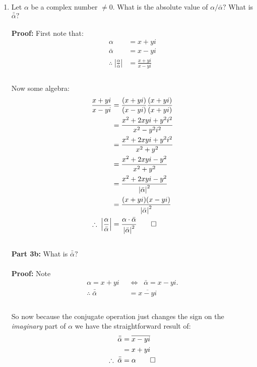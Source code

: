 \begin{enumerate}
	\item Let $\alpha$ be a complex number $\neq 0.$ What is the absolute value of $\alpha/\bar{\alpha}?$ What is $\bar{\bar{\alpha}}?$ \\
	\\
	\textbf{Proof:} First note that: 
	\begin{align*}
	\alpha &= x + yi \\
	\bar{\alpha} &= x - yi \\
	\therefore \; \left| \frac{\alpha}{\bar{\alpha}} \right| &= \frac{x + yi}{x - yi} \\
	\end{align*}
	\\
	Now some algebra:
	\begin{align*}
	\frac{x + yi}{x - yi} &= \frac{(x + yi)}{(x - yi)} \frac{(x + yi)}{(x + yi)} \\
	&= \frac{x^2 + 2xyi +y^2 i^2}{x^2 - y^2 i^2} \\
	&= \frac{x^2 + 2xyi +y^2 i^2}{x^2 + y^2} \\
	&= \frac{x^2 + 2xyi - y^2}{x^2 + y^2 } \\
	&= \frac{x^2 + 2xyi - y^2}{ \left | \bar{\alpha} \right |^2  } \\
	&= \frac{(x + yi)(x - yi)}{ \left | \bar{\alpha} \right |^2  } \\
	\therefore \; \left| \frac{\alpha}{\bar{\alpha}} \right|  &= \frac{\alpha \cdot \bar{\alpha}}{ \left | \bar{\alpha} \right |^2  } \qed \\
	\end{align*}
	\\
	\subitem \textbf{Part 3b:} What is $\bar{\bar{\alpha}}?$ \\
	\\
	\textbf{Proof:} Note 
	\begin{align*}
	\alpha = x + yi \;\; & \Leftrightarrow \;\; \bar{\alpha} = x - yi. \\ 
	\therefore \; \bar{\bar{\alpha}} &= \overline{x - yi}\\
	\end{align*}
	\\
	So now because the conjugate operation just changes the sign on the \textit{imaginary} part of $\alpha$ we have the straightforward result of:
	\begin{align*}
	\bar{\bar{\alpha}} &= \overline{x - yi} \\ 
	&= x + yi \\
	\therefore \; \bar{\bar{\alpha}} &= \alpha \qed
	\end{align*}
	

\end{enumerate}
